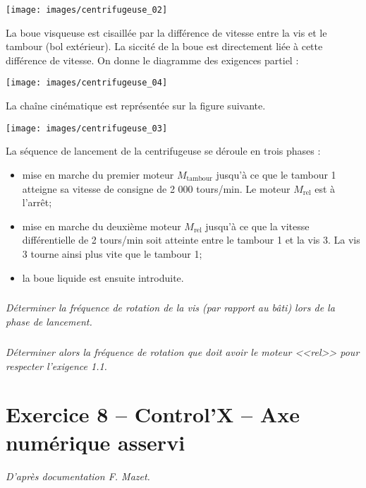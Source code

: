 \documentclass[10pt,fleqn]{article} %
\begin{document}
\begin{multicols}{2}
\normalsize

\begin{center}
\texttt{[image: images/centrifugeuse\_02]}
\end{center}

La boue visqueuse est cisaillée par la différence de vitesse entre la vis et le tambour (bol extérieur).
La siccité de la boue est directement liée à cette différence de vitesse. On donne le diagramme des exigences partiel :

\begin{center}
\texttt{[image: images/centrifugeuse\_04]}
\end{center}


La chaîne cinématique est représentée sur la figure
suivante.

\begin{center}
\texttt{[image: images/centrifugeuse\_03]}
\end{center}






La séquence de lancement de la centrifugeuse se déroule en trois phases :
\begin{itemize}
\item mise en marche du premier moteur $M_{\text{tambour}}$ jusqu’à ce que le tambour 1 atteigne sa vitesse
de consigne de 2 000 tours/min. Le moteur $M_{\text{rel}}$ est à l’arrêt;
\item mise en marche du deuxième moteur $M_{\text{rel}}$ jusqu’à ce que la vitesse différentielle de
2 tours/min soit atteinte entre le tambour 1 et la vis 3. La vis 3 tourne ainsi plus vite que le
tambour 1;
\item la boue liquide est ensuite introduite.
\end{itemize}

\subparagraph{}
\textit{Déterminer la fréquence de rotation de la vis (par rapport au bâti) lors de la phase de lancement.}

\subparagraph{}
\textit{Déterminer alors la fréquence de rotation que doit avoir le moteur <<rel>> pour respecter l'exigence 1.1.}


\newpage

\section*{Exercice 8 -- Control'X -- Axe numérique asservi}
\setcounter{exo}{0}

\textit{ D'après documentation F. Mazet.}


\end{multicols}
\end{document}

